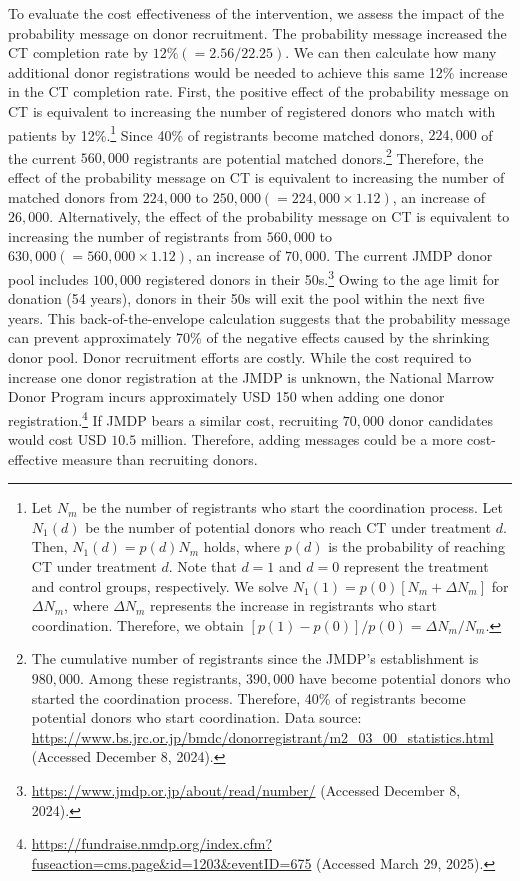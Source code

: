 \documentclass[12pt, a4paper]{article}
\begin{document}
To evaluate the cost effectiveness of the intervention, we assess the impact of the probability message on donor recruitment. The probability message increased the CT completion rate by \(12\% (= 2.56/22.25)\). We can then calculate how many additional donor registrations would be needed to achieve this same 12\% increase in the CT completion rate. First, the positive effect of the probability message on CT is equivalent to increasing the number of registered donors who match with patients by 12\%.\footnote{Let \(N_m\) be the number of registrants who start the coordination process. Let \(N_1(d)\) be the number of potential donors who reach CT under treatment \(d\). Then, \(N_1(d) = p(d)N_m\) holds, where \(p(d)\) is the probability of reaching CT under treatment \(d\). Note that \(d = 1\) and \(d = 0\) represent the treatment and control groups, respectively. We solve \(N_1(1) = p(0)[N_m + \Delta N_m]\) for \(\Delta N_m\), where \(\Delta N_m\) represents the increase in registrants who start coordination. Therefore, we obtain \([p(1) - p(0)]/p(0) = \Delta N_m/N_m\).} Since 40\% of registrants become matched donors, \(224,000\) of the current \(560,000\) registrants are potential matched donors.\footnote{The cumulative number of registrants since the JMDP's establishment is \(980,000\). Among these registrants, \(390,000\) have become potential donors who started the coordination process. Therefore, 40\% of registrants become potential donors who start coordination. Data source: \url{https://www.bs.jrc.or.jp/bmdc/donorregistrant/m2_03_00_statistics.html} (Accessed December 8, 2024).} Therefore, the effect of the probability message on CT is equivalent to increasing the number of matched donors from \(224,000\) to \(250,000 (= 224,000 \times 1.12)\), an increase of \(26,000\). Alternatively, the effect of the probability message on CT is equivalent to increasing the number of registrants from \(560,000\) to \(630,000 (= 560,000 \times 1.12)\), an increase of \(70,000\). The current JMDP donor pool includes \(100,000\) registered donors in their 50s.\footnote{\url{https://www.jmdp.or.jp/about/read/number/} (Accessed December 8, 2024).} Owing to the age limit for donation (54 years), donors in their 50s will exit the pool within the next five years. This back-of-the-envelope calculation suggests that the probability message can prevent approximately 70\% of the negative effects caused by the shrinking donor pool. Donor recruitment efforts are costly. While the cost required to increase one donor registration at the JMDP is unknown, the National Marrow Donor Program incurs approximately USD 150 when adding one donor registration.\footnote{\url{https://fundraise.nmdp.org/index.cfm?fuseaction=cms.page\&id=1203\&eventID=675} (Accessed March 29, 2025).} If JMDP bears a similar cost, recruiting \(70,000\) donor candidates would cost USD \(10.5\) million. Therefore, adding messages could be a more cost-effective measure than recruiting donors.
\end{document}
